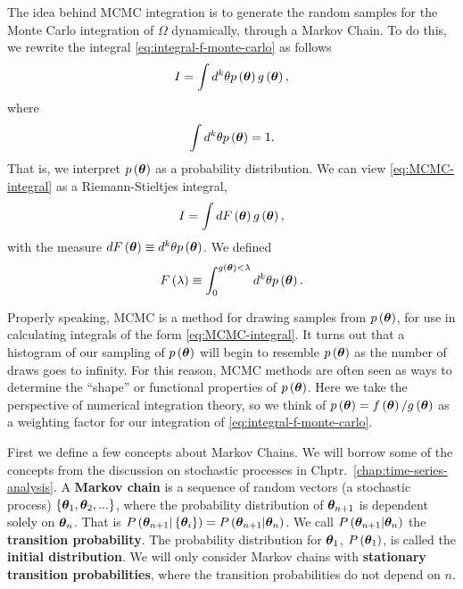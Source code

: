 The idea behind MCMC integration 
is to generate the random samples for the Monte Carlo
integration of $\Omega$ dynamically, through a Markov Chain. 
To do this, we rewrite the integral \eqref{eq:integral-f-monte-carlo} as follows
\begin{align}
    \label{eq:MCMC-integral}
    I
    =
    \int d^k\theta p\left({\bm \theta}\right)g\left({\bm \theta}\right) 
    ,
\end{align}
where
\begin{align}
    \int d^k\theta p\left({\bm \theta}\right)
    =
    1
    .
\end{align}
That is, we interpret $p\left({\bm \theta}\right)$ as a probability distribution.
We can view \eqref{eq:MCMC-integral} as a Riemann-Stieltjes integral,
\begin{align}
    \label{eq:riemann-steiltjes-integral}
    I
    =
    \int dF\left({\bm \theta}\right) g\left({\bm \theta}\right)
    ,
\end{align}
with the measure $dF\left({\bm \theta}\right) \equiv d^k\theta p\left({\bm \theta}\right)$.
We defined
\begin{align}
    \label{eq:F-RS-int}
    F\left(\lambda\right)
    \equiv
    \int_0^{g\left({\bm \theta}\right)<\lambda} d^k\theta p\left({\bm \theta}\right)
    .
\end{align}

Properly speaking, MCMC is a method for drawing samples from $p\left({\bm \theta}\right)$, for use in calculating integrals of the form \eqref{eq:MCMC-integral}.
It turns out that a histogram of our sampling of $p\left({\bm \theta}\right)$ will
begin to resemble $p\left({\bm \theta}\right)$ as the number of draws goes to infinity.
For this reason, MCMC methods are often seen as ways to determine the ``shape''
or functional properties of $p\left({\bm \theta}\right)$.
Here we take the perspective of numerical integration theory, so we think of 
$p\left({\bm \theta}\right) = f\left({\bm \theta}\right)/g\left({\bm \theta}\right)$ 
as a weighting factor for our integration of \eqref{eq:integral-f-monte-carlo}. 

First we define a few concepts about Markov Chains.
We will borrow some of the concepts from the discussion on stochastic processes
in Chptr.~\ref{chap:time-series-analysis}.
A \textbf{Markov chain} is a sequence of random vectors
(a stochastic process) $\left\{{\bm \theta}_1,{\bm \theta}_2,...\right\}$, 
where the probability distribution of ${\bm \theta}_{n+1}$ is dependent solely on ${\bm \theta}_n$.
That is 
$P\left({\bm \theta}_{n+1}|\left\{{\bm \theta}_i\right\}\right) 
 =
 P\left({\bm \theta}_{n+1}|{\bm \theta}_n\right)$. 
We call $P\left({\bm \theta}_{n+1}|{\bm \theta}_n\right)$ the \textbf{transition probability}. 
The probability distribution for ${\bm \theta}_1$, $P\left({\bm \theta}_1\right)$, is called
the \textbf{initial distribution}.
We will only consider Markov chains with \textbf{stationary transition probabilities},
where the transition probabilities do not depend on $n$.

